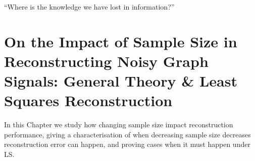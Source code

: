 
\begin{savequote}[8cm]
``Where is the knowledge we have lost in information?''
\end{savequote}

\chapter{\label{ch:proj1_LS}On the Impact of Sample Size in Reconstructing Noisy Graph Signals: General Theory \&  Least Squares Reconstruction}


In this Chapter we study how changing sample size impact reconstruction performance, giving a characterisation of when decreasing sample size decreases reconstruction error can happen, and proving cases when it must happen under LS. 

